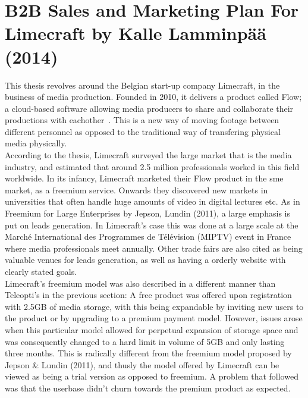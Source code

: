 {\section{B2B Sales and Marketing Plan For Limecraft by Kalle Lamminpää (2014)}
This thesis revolves around the Belgian start-up company Limecraft, in the business of media production. Founded in 2010, it delivers a product called Flow; a cloud-based software allowing media producers to share and collaborate their productions with eachother~\cite{lamminpaa2014b2b}. This is a new way of moving footage between different personnel as opposed to the traditional way of transfering physical media physically. 
\newline
\\
According to the thesis, Limecraft surveyed the large market that is the media industry, and estimated that around 2.5 million professionals worked in this field worldwide. In its infancy, Limecraft marketed their Flow product in the \gls{sme} market, as a freemium service. Onwards they discovered new markets in universities that often handle huge amounts of video in digital lectures etc. As in Freemium for Large Enterprises by Jepson, Lundin (2011), a large emphasis is put on leads generation. In Limecraft's case this was done at a large scale at the  Marché International des Programmes de Télévision (MIPTV) event in France where media professionals meet annually. Other trade fairs are also cited as being valuable venues for leads generation, as well as having a orderly website with clearly stated goals. 
\newline
\\
Limecraft's freemium model was also described in a different manner than Teleopti's in the previous section: A free product was offered upon registration with 2.5GB of media storage, with this being expandable by inviting new users to the product or by upgrading to a premium payment model. However, issues arose when this particular model allowed for perpetual expansion of storage space and was consequently changed to a hard limit in volume of 5GB and only lasting three months. This is radically different from the freemium model proposed by Jepson \& Lundin (2011), and thusly the model offered by Limecraft can be viewed as being a trial version as opposed to freemium. A problem that followed was that the userbase didn't churn towards the premium product as expected. 
\newline
\\
}
